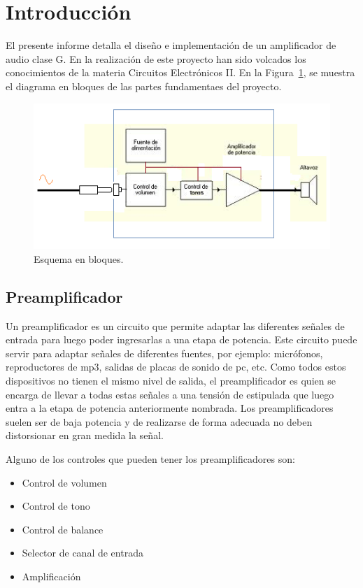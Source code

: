 \section{Introducción}
\bigskip

El presente informe detalla el diseño e implementación de un amplificador de audio clase G. En la realización de este proyecto han sido volcados los conocimientos de la materia Circuitos Electrónicos II. En la Figura~\ref{esquema_bloques}, se muestra el diagrama en bloques de las partes fundamentaes del proyecto.
	
	\begin{figure}[H]
	\centering
	\includegraphics[scale=0.65]{img/esquema_bloques.png}
	\caption{Esquema en bloques.}
	\label{esquema_bloques} 
	\end{figure}
	
\medskip 
\subsection{Preamplificador}
	
Un preamplificador es un circuito que permite adaptar las diferentes señales de entrada para luego poder ingresarlas a una etapa de potencia. Este circuito puede servir para adaptar señales de diferentes fuentes, por ejemplo: micrófonos, reproductores de mp3, salidas de placas de sonido de  pc, etc. Como todos estos dispositivos no tienen el mismo nivel de salida, el preamplificador es quien se encarga de llevar a todas estas señales a una tensión de estipulada que luego entra a la etapa de potencia anteriormente nombrada. Los preamplificadores suelen ser de baja potencia y de realizarse de forma adecuada no deben distorsionar en gran medida la señal.

Alguno de los controles que pueden tener los preamplificadores son:
	
\begin{itemize}
	\item Control de volumen
	\item Control de tono
	\item Control de balance
	\item Selector de canal de entrada 
	\item Amplificación
	\end{itemize}	
	
